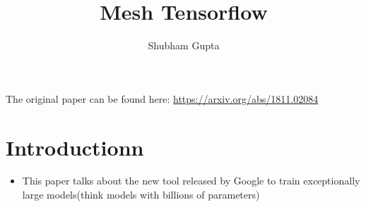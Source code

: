 \documentclass[a4paper]{article}
\title{Mesh Tensorflow}
\author{Shubham Gupta}
\begin{document}
\maketitle
The original paper can be found here: \url{https://arxiv.org/abs/1811.02084}
\section{Introductionn}
\begin{itemize}
    \item This paper talks about the new tool released by Google to train exceptionally large models(think models with billions of parameters)
\end{itemize}
\end{document}
